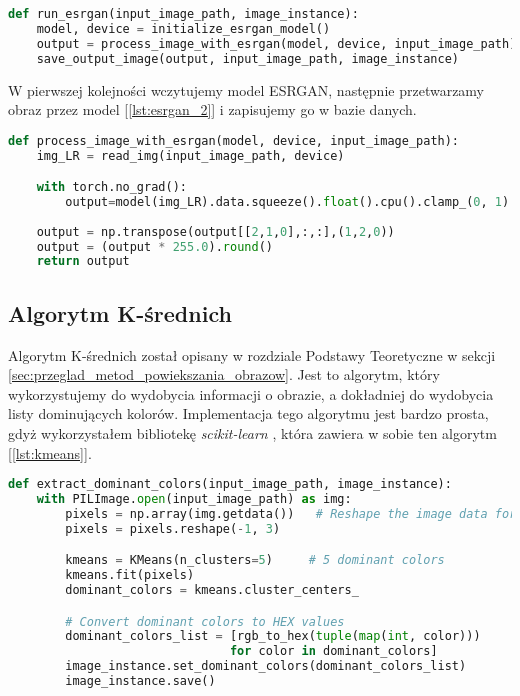 \begin{lstlisting}[language=Python, caption=Implementacja algorytmu ESRGAN., label={lst:esrgan}]    
def run_esrgan(input_image_path, image_instance):
    model, device = initialize_esrgan_model()
    output = process_image_with_esrgan(model, device, input_image_path)
    save_output_image(output, input_image_path, image_instance)
\end{lstlisting}

W pierwszej kolejności wczytujemy model ESRGAN, następnie przetwarzamy obraz przez model [\ref{lst:esrgan_2}] i zapisujemy go w bazie danych.


\begin{lstlisting}[language=Python, caption=Przetwarzanie przez model ESRGAN., label={lst:esrgan_2}]
def process_image_with_esrgan(model, device, input_image_path):
    img_LR = read_img(input_image_path, device)

    with torch.no_grad():
        output=model(img_LR).data.squeeze().float().cpu().clamp_(0, 1).numpy()
    
    output = np.transpose(output[[2,1,0],:,:],(1,2,0))
    output = (output * 255.0).round()
    return output
\end{lstlisting}


\subsection*{Algorytm K-średnich}

Algorytm K-średnich został opisany w rozdziale Podstawy Teoretyczne w sekcji \ref{sec:przeglad_metod_powiekszania_obrazow}.
Jest to algorytm, który wykorzystujemy do wydobycia informacji o obrazie, a dokładniej do wydobycia listy dominujących kolorów. Implementacja tego algorytmu jest bardzo prosta, gdyż wykorzystałem bibliotekę \textit{scikit-learn} \cite{sklearn}, która zawiera w sobie ten algorytm [\ref{lst:kmeans}].

\begin{lstlisting}[language=Python, caption=Implementacja algorytmu K-średnich., label={lst:kmeans}]
def extract_dominant_colors(input_image_path, image_instance):
    with PILImage.open(input_image_path) as img:
        pixels = np.array(img.getdata())   # Reshape the image data for k-means
        pixels = pixels.reshape(-1, 3)

        kmeans = KMeans(n_clusters=5)     # 5 dominant colors
        kmeans.fit(pixels)
        dominant_colors = kmeans.cluster_centers_

        # Convert dominant colors to HEX values
        dominant_colors_list = [rgb_to_hex(tuple(map(int, color))) 
                               for color in dominant_colors]
        image_instance.set_dominant_colors(dominant_colors_list)
        image_instance.save()
\end{lstlisting}

